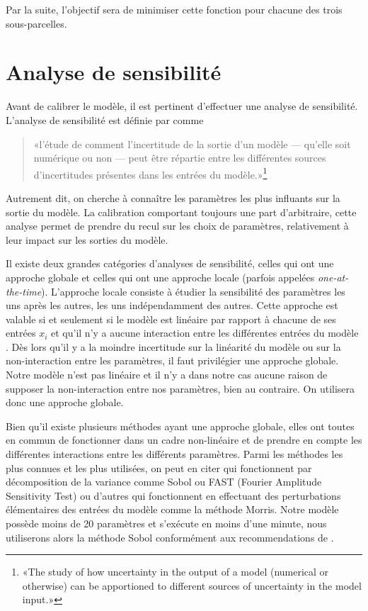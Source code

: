 Par la suite, l'objectif sera de minimiser cette fonction pour chacune des trois sous-parcelles.

\section{Analyse de sensibilité}

Avant de calibrer le modèle, il est pertinent d'effectuer une analyse de sensibilité.
L'analyse de sensibilité est définie par \citet{saltelli2004} comme
\begin{quote}
 «l'étude de comment l'incertitude de la sortie d'un modèle --- qu'elle soit numérique ou non --- peut être répartie entre les différentes sources d'incertitudes présentes dans les entrées du modèle.»\footnote{«The study of how uncertainty in the output of a model (numerical or otherwise) can be apportioned to different sources of uncertainty in the model input.»}
\end{quote}
Autrement dit, on cherche à connaître les paramètres les plus influants sur la sortie du modèle.
La calibration comportant toujours une part d'arbitraire, cette analyse permet de prendre du recul sur les choix de paramètres, relativement à leur impact sur les sorties du modèle.

Il existe deux grandes catégories d'analyses de sensibilité, celles qui ont une approche globale et celles qui ont une approche locale (parfois appelées \emph{one-at-the-time}).
L'approche locale consiste à étudier la sensibilité des paramètres les uns après les autres, les uns indépendamment des autres.
Cette approche est valable si et seulement si le modèle est linéaire par rapport à chacune de ses entrées $x_i$ et qu'il n'y a aucune interaction entre les différentes entrées du modèle \citep{saltelli2019so}.
Dès lors qu'il y a la moindre incertitude sur la linéarité du modèle ou sur la non-interaction entre les paramètres, il faut privilégier une approche globale.
Notre modèle n'est pas linéaire et il n'y a dans notre cas aucune raison de supposer la non-interaction entre nos paramètres, bien au contraire.
On utilisera donc une approche globale.

Bien qu'il existe plusieurs méthodes ayant une approche globale, elles ont toutes en commun de fonctionner dans un cadre non-linéaire et de prendre en compte les différentes interactions entre les différents paramètres.
Parmi les méthodes les plus connues et les plus utilisées, on peut en citer qui fonctionnent par décomposition de la variance comme Sobol ou FAST (Fourier Amplitude Sensitivity Test) ou d'autres qui fonctionnent en effectuant des perturbations élémentaires des entrées du modèle comme la méthode Morris.
Notre modèle possède moins de 20 paramètres et s'exécute en moins d'une minute, nous utiliserons alors la méthode Sobol conformément aux recommendations de \citet[chap. 6]{saltelli}.

